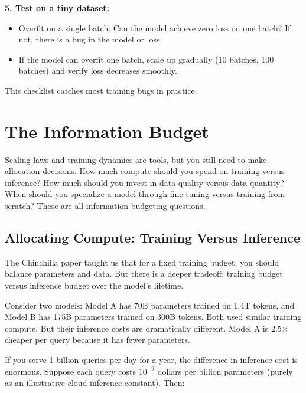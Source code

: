 \begin{examplebox}
\textbf{5. Test on a tiny dataset:}
\begin{itemize}
\item Overfit on a single batch. Can the model achieve zero loss on one batch? If not, there is a bug in the model or loss.
\item If the model can overfit one batch, scale up gradually (10 batches, 100 batches) and verify loss decreases smoothly.
\end{itemize}

\vspace{0.5em}

This checklist catches most training bugs in practice.
\end{examplebox}

\vspace{1.5em}

\vspace{2em}

\section{The Information Budget}

Scaling laws and training dynamics are tools, but you still need to make allocation decisions. How much compute should you spend on training versus inference? How much should you invest in data quality versus data quantity? When should you specialize a model through fine-tuning versus training from scratch? These are all information budgeting questions.

\vspace{1em}

\subsection{Allocating Compute: Training Versus Inference}

The Chinchilla paper taught us that for a fixed training budget, you should balance parameters and data. But there is a deeper tradeoff: training budget versus inference budget over the model's lifetime.

Consider two models: Model A has 70B parameters trained on 1.4T tokens, and Model B has 175B parameters trained on 300B tokens. Both used similar training compute. But their inference costs are dramatically different. Model A is 2.5× cheaper per query because it has fewer parameters.

If you serve 1 billion queries per day for a year, the difference in inference cost is enormous. Suppose each query costs $10^{-9}$ dollars per billion parameters (purely as an illustrative cloud-inference constant). Then:

